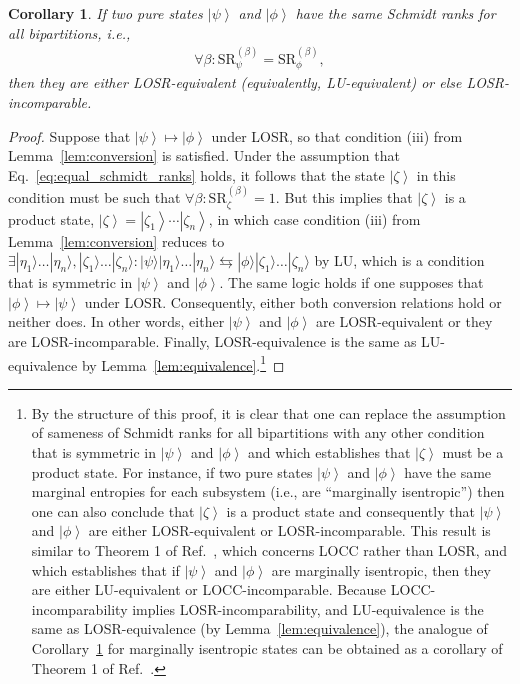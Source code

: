 \documentclass[prx,11pt,letterpaper,twocolumn,accepted=2023-11-27]{quantumarticle}
\newcommand{\ket}[1]{\left| #1 \right>}
\theoremstyle{plain}
\newtheorem{cor}[theo]{Corollary}
\theoremstyle{definition}
\begin{document}
    \begin{cor}
        \label{cor:equivalent_or_incomparable}
        If two pure states $\ket{\psi}$ and $\ket{\phi}$ have the same Schmidt ranks for all bipartitions, i.e., 
        \begin{align}
            \label{eq:equal_schmidt_ranks}
            \forall \beta: \mathrm{SR}_{\psi}^{(\beta)} = \mathrm{SR}_{\phi}^{(\beta)},
        \end{align}
        then they are either 
        LOSR-equivalent (equivalently, LU-equivalent)
         or else LOSR-incomparable.
    \end{cor}
    \begin{proof}
Suppose that $\ket{\psi} \mapsto \ket{\phi}$ under LOSR, so that condition (iii) from Lemma~\ref{lem:conversion}
         is satisfied.           Under the assumption that 
        Eq.~\eqref{eq:equal_schmidt_ranks} holds, it follows that the state $\ket{\zeta}$ in this condition must be such that $\forall \beta: \mathrm{SR}_{\zeta}^{(\beta)} = 1$.  But this implies that $\ket{\zeta}$ is a product state, $\ket \zeta = \ket {\zeta_1} \cdots \ket {\zeta_n}$, in which case 
condition (iii) from Lemma~\ref{lem:conversion} reduces to $\exists |\eta_1\rangle \dots |\eta_n\rangle, |\zeta_1\rangle \dots |\zeta_n\rangle : |\psi\rangle |\eta_1\rangle \dots |\eta_n\rangle \leftrightarrows |\phi\rangle |\zeta_1\rangle \dots |\zeta_n\rangle$ by LU,
         which is a condition that is symmetric in $\ket \psi$ and $\ket \phi$.  The same logic holds if one supposes that $\ket{\phi} \mapsto \ket{\psi}$ under LOSR. Consequently, either both conversion relations hold or neither does.  In other words, either $\ket{\psi}$ and $\ket{\phi}$ are LOSR-equivalent  or they are LOSR-incomparable.  Finally, LOSR-equivalence is the same as LU-equivalence by Lemma~\ref{lem:equivalence}.\footnote{By the structure of this proof, it is clear that one can replace the assumption of sameness of Schmidt ranks for all bipartitions with
  any other condition that is symmetric in $\ket \psi$ and $\ket \phi$ and which establishes that $\ket \zeta$ must be a product state. For instance, if two pure states $\ket \psi$ and $\ket \phi$ have the same marginal entropies for each subsystem (i.e., are ``marginally isentropic'') then one can also conclude that $\ket{\zeta}$ is a product state and consequently that $\ket \psi$ and $\ket \phi$ are either LOSR-equivalent or LOSR-incomparable.  This result is similar to Theorem 1 of Ref.~\cite{bennett2000exact}, which concerns LOCC rather than LOSR, and which establishes that if $\ket \psi$ and $\ket \phi$ are marginally isentropic, then they are either LU-equivalent or LOCC-incomparable.   Because LOCC-incomparability implies LOSR-incomparability, and LU-equivalence is the same as LOSR-equivalence (by Lemma~\ref{lem:equivalence}), the analogue of Corollary~\ref{cor:equivalent_or_incomparable} for marginally isentropic states can be obtained as a corollary of Theorem 1 of Ref.~\cite{bennett2000exact}.}
    \end{proof}
\end{document}
